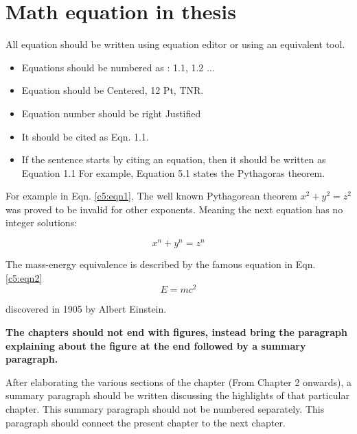 \section{Math equation in thesis}
All equation should be written using equation editor or using an equivalent tool.
\begin{itemize}
	\item Equations should be numbered as : 1.1, 1.2 ...
	\item Equation should be Centered, 12 Pt, TNR. 
	\item Equation number should be right Justified
	\item It should be cited as Eqn. 1.1.
   \item If the sentence starts by citing an equation, then it should be written as Equation 1.1 For example, Equation 5.1 states the Pythagoras theorem.

	
\end{itemize}

For example in Eqn. \ref{c5:eqn1}, The well known Pythagorean theorem $x^2 + y^2 = z^2$ was 
proved to be invalid for other exponents. 
Meaning the next equation has no integer solutions:

\begin{equation}
\label{c5:eqn1}
	x^n + y^n = z^n
\end{equation}

The mass-energy equivalence is described by the famous equation in Eqn. \ref{c5:eqn2}
\begin{equation}
\label{c5:eqn2}
	E=mc^2
\end{equation}

discovered in 1905 by Albert Einstein. 

\vspace{0.75cm}

 \textbf{The chapters should not end with figures, instead bring the paragraph explaining about the figure at the end followed by a summary paragraph.}

After elaborating the various sections of the chapter (From Chapter 2 onwards), a summary paragraph should be written discussing the highlights of that particular chapter. This summary paragraph should not be numbered separately. This paragraph should connect the present chapter to the next chapter.



